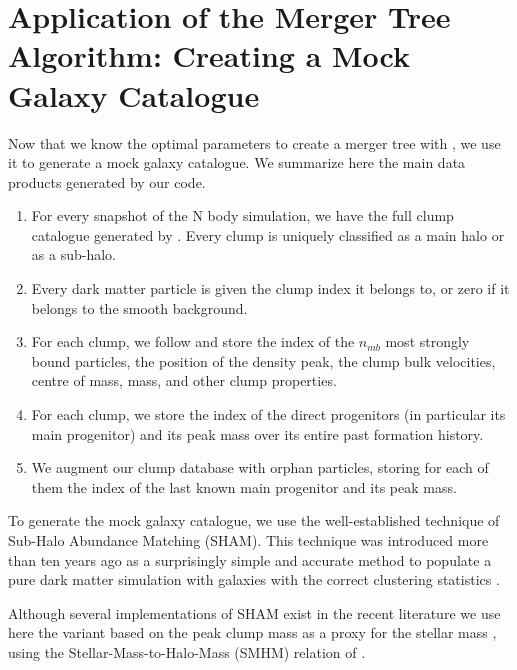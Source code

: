 \chapter{Application of the Merger Tree Algorithm: Creating a Mock Galaxy Catalogue}
\label{chap:mock_catalogues}

Now that we  know the optimal parameters to create  a merger tree with
\acacia, we  use it to  generate a mock galaxy  catalogue.  We
summarize here the main data products generated by our code.
\begin{enumerate}
\item For  every snapshot of the  N body simulation, we  have the full
  clump catalogue  generated by \phew. Every  clump is uniquely
  classified as a main halo or as a sub-halo.
\item Every dark  matter particle is given the clump  index it belongs
  to, or zero if it belongs to the smooth background.
\item For  each clump, we follow  and store the index  of the $n_{mb}$
  most strongly bound particles, the position of the density peak, the
  clump  bulk  velocities,  centre  of mass,  mass,  and  other  clump
  properties.
\item For each clump, we store the index of the direct progenitors (in
  particular its  main progenitor) and  its peak mass over  its entire
  past formation history.
\item We augment our clump database with orphan particles, storing for
  each of  them the index  of the last  known main progenitor  and its
  peak mass.
\end{enumerate}
To generate  the mock  galaxy catalogue,  we use  the well-established
technique of  Sub-Halo Abundance  Matching (SHAM). This  technique was
introduced  more than  ten  years  ago as  a  surprisingly simple  and
accurate  method  to  populate  a pure  dark  matter  simulation  with
galaxies  with the  correct  clustering statistics
\citep{valeNonparametricModelLinking2006, shankarNewRelationshipsGalaxy2006,
conroyModelingLuminositydependentGalaxy2006}.


Although  several   implementations  of  SHAM  exist   in  the  recent
literature \citep{guoHowGalaxiesPopulate2010,
wetzelWhatDeterminesSatellite2010,
mosterConstraintsRelationshipStellar2010, trujillo-gomezGalaxiesLCDMHalo2011,
nuzaClusteringGalaxiesSDSSIII2013,
zentnerGalaxyAssemblyBias2014,
chaves-monteroSubhaloAbundanceMatching2016} we use here  the variant
based on the peak clump mass as a proxy for the stellar mass
\citep{reddickConnectionGalaxiesDark2013},  using          the
Stellar-Mass-to-Halo-Mass (SMHM) relation of 	\cite{behrooziAVERAGESTARFORMATION2013}.


